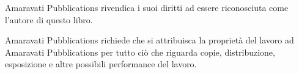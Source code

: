 {Amaravati Pubblications rivendica i suoi diritti ad essere riconosciuta come l'autore di questo libro.

Amaravati Pubblications richiede che si attribuisca la proprietà del lavoro ad Amaravati Pubblications per tutto ciò che riguarda copie, distribuzione, esposizione e altre possibili performance del lavoro.

}
